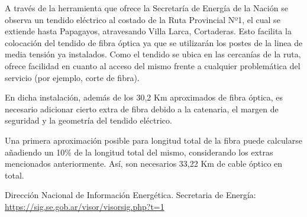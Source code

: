 A través de la herramienta que ofrece la Secretaría de Energía de la Nación se observa un tendido eléctrico al costado de la Ruta Provincial Nº1, el cual se extiende hasta Papagayos, atravesando Villa Larca, Cortaderas. Esto facilita la colocación del tendido de fibra óptica ya que se utilizarán los postes de la linea de media tensión ya instalados.
Como el tendido se ubica en las cercanías de la ruta, ofrece facilidad en cuanto al acceso del mismo frente a cualquier problemática del servicio (por ejemplo, corte de fibra).



En dicha instalación, además de los 30,2 Km aproximados de fibra óptica, es necesario adicionar cierto extra de fibra debido a la catenaria, el margen de seguridad y la geometría del tendido eléctrico.

Una primera aproximación posible para longitud total de la fibra puede calcularse añadiendo un 10\% de la longitud total del mismo, considerando los extras mencionados anteriormente. Así, son necesarios 33,22 Km de cable óptico en total.






\newpage

\begin{thebibliography}{99}
Dirección Nacional de Información Energética. Secretaria de Energía: \url{https://sig.se.gob.ar/visor/visorsig.php?t=1}

\end{thebibliography}


\newpage